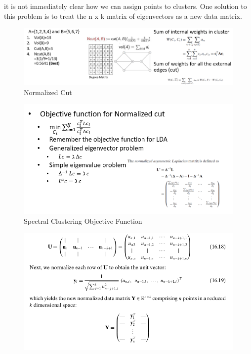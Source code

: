 \begin{itemize}
    it is not immediately clear how we can assign points to clusters. One solution to this
    problem is to treat the n x k matrix of eigenvectors as a new data matrix.
    \begin{figure}[H]
        \centerline{\includegraphics[width=1.6\textwidth]{Figures/normcut.png}}
        \caption{\label{fig:figure7}Normalized Cut}
    \end{figure}
    \begin{figure}[H]
        \centerline{\includegraphics[width=1.4\textwidth]{Figures/spectral2.png}}
        \caption{\label{fig:figure8}Spectral Clustering Objective Function}
    \end{figure}
    \begin{figure}[H]
        \centerline{\includegraphics[width=1.2\textwidth]{Figures/yspectral.png}}

\end{figure}
\end{itemize}
